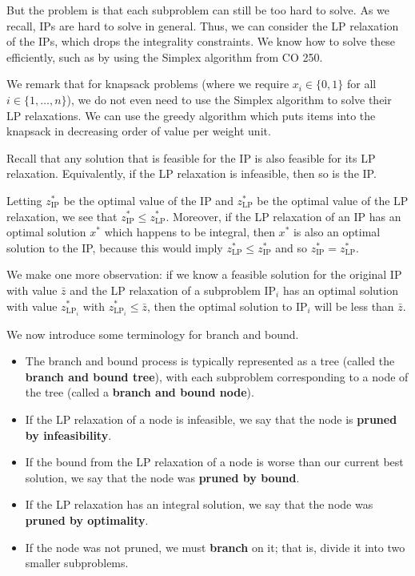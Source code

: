 But the problem is that each subproblem can still be too hard to solve. As 
we recall, IPs are hard to solve in general. 
Thus, we can consider the LP relaxation of the IPs, which drops the integrality 
constraints. We know how to solve these efficiently, such as by using the 
Simplex algorithm from CO 250. 

We remark that for knapsack problems (where we require $x_i \in \{0, 1\}$ for all 
$i \in \{1, \dots, n\}$), we do not even need to use the Simplex 
algorithm to solve their LP relaxations. We can use the greedy algorithm 
which puts items into the knapsack in decreasing order of value per 
weight unit. 

Recall that any solution that is feasible for the IP is also feasible 
for its LP relaxation. Equivalently, if the LP relaxation is infeasible, 
then so is the IP. 

Letting $z_{\text{IP}}^*$ be the optimal value of the 
IP and $z_{\text{LP}}^*$ be the optimal value of the LP relaxation, 
we see that $z_{\text{IP}}^* \leq z_{\text{LP}}^*$. Moreover, if the LP 
relaxation of an IP has an optimal solution $x^*$ which happens 
to be integral, then $x^*$ is also an optimal solution to the IP, because 
this would imply $z_{\text{LP}}^* \leq z_{\text{IP}}^*$ and so 
$z_{\text{IP}}^* = z_{\text{LP}}^*$. 

We make one more observation: if we know a feasible solution for the original 
IP with value $\bar{z}$ and the LP relaxation of a subproblem $\text{IP}_i$ 
has an optimal solution with value $z_{\text{LP}_i}^*$ with 
$z_{\text{LP}_i}^* \leq \bar{z}$, then the optimal solution to $\text{IP}_i$ 
will be less than $\bar{z}$. 

We now introduce some terminology for branch and bound. 
\begin{itemize}
    \item The branch and bound process is typically represented as a tree 
    (called the {\bf branch and bound tree}), with each subproblem corresponding 
    to a node of the tree (called a {\bf branch and bound node}). 
    \item If the LP relaxation of a node is infeasible, we say that the 
    node is {\bf pruned by infeasibility}. 
    \item If the bound from the LP relaxation of a node is worse than 
    our current best solution, we say that the node was {\bf pruned by bound}. 
    \item If the LP relaxation has an integral solution, we say that the node was 
    {\bf pruned by optimality}. 
    \item If the node was not pruned, we must {\bf branch} on it; that is, 
    divide it into two smaller subproblems.
\end{itemize}

